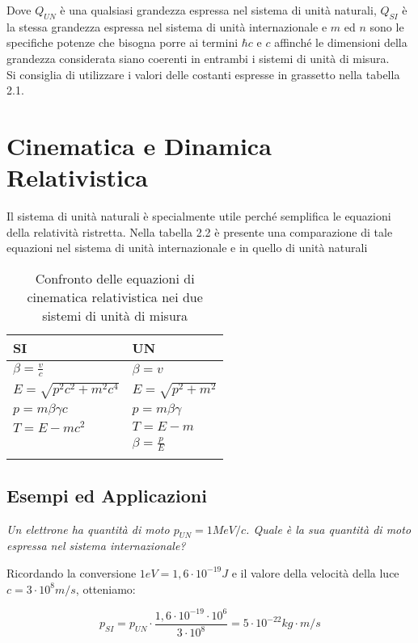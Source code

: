 Dove $Q_{UN}$ è una qualsiasi grandezza espressa nel sistema di unità naturali, $Q_{SI}$ è la stessa grandezza espressa nel sistema di unità internazionale e $m$ ed $n$ sono le specifiche potenze che bisogna porre ai termini $\hbar c$ e $c$ affinché le dimensioni della grandezza considerata siano coerenti in entrambi i sistemi di unità di misura.\\
Si consiglia di utilizzare i valori delle costanti espresse in grassetto nella tabella 2.1.

\section{Cinematica e Dinamica Relativistica}

Il sistema di unità naturali è specialmente utile perché semplifica le equazioni della relatività ristretta. Nella tabella 2.2 è presente una comparazione di tale equazioni nel sistema di unità internazionale e in quello di unità naturali

\begin{table}
\centering
\begin{tabular}{|l|l|}\hline
SI & UN \\ \hline
$\beta=\frac{v}{c}$   & $\beta=v$   \\ \hline
$E=\sqrt{p^2c^2+m^2c^4}$   &   $E=\sqrt{p^2+m^2}$ \\ \hline
$p=m\beta\gamma c$   &  $p=m\beta\gamma$  \\ \hline
$T=E-mc^2$   &  $T=E-m$  \\ \hline 
   &  $\beta=\frac{p}{E}$  \\ \hline
   &  \\ \hline
\end{tabular}
\label{equazioni}
\caption{Confronto delle equazioni di cinematica relativistica nei due sistemi di unità di misura}
\end{table}

\subsection{Esempi ed Applicazioni}

\emph{Un elettrone ha quantità di moto $p_{UN}=1 MeV/c$. Quale è la sua quantità di moto espressa nel sistema internazionale?}

Ricordando la conversione $1 eV=1,6\cdot10^{-19} J$ e il valore della velocità della luce $c=3\cdot 10^8 m/s$, otteniamo:

\begin{equation}
p_{SI}=p_{UN}\cdot\frac{1,6\cdot10^{-19}\cdot10^6}{3\cdot10^8}=5\cdot10^{-22}kg\cdot m/s
\end{equation}

